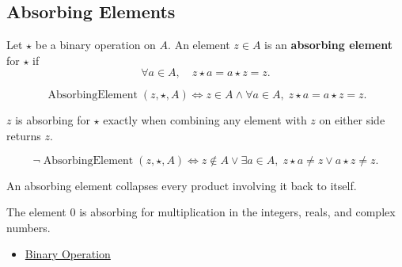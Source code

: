 \subsection*{Absorbing Elements}
\label{subsec:absorbing-elements}

\begin{definition}
\label{def:algebraic-absorbing-element}
Let $\star$ be a binary operation on $A$.
An element $z\in A$ is an \textbf{absorbing element} for $\star$ if
\[
\forall a\in A,\quad z\star a=a\star z=z.
\]
\end{definition}

\begin{remark*}
\[
\operatorname{AbsorbingElement}(z,\star,A)
\Longleftrightarrow
z\in A
\land
\forall a\in A,\; z\star a=a\star z=z.
\]
\end{remark*}

\begin{remark*}
$z$ is absorbing for $\star$ exactly when combining any element with $z$ on
either side returns $z$.
\end{remark*}

\begin{remark*}
\[
\neg\operatorname{AbsorbingElement}(z,\star,A)
\Longleftrightarrow
z\notin A
\lor
\exists a\in A,\; z\star a\neq z \lor a\star z\neq z.
\]
\end{remark*}

\begin{remark*}[Interpretation]
An absorbing element collapses every product involving it back to itself.
\end{remark*}

\begin{remark*}[Examples]
The element $0$ is absorbing for multiplication in the integers, reals, and
complex numbers.
\end{remark*}

\begin{dependencies}
\begin{itemize}
  \item \hyperref[def:binary-operation]{Binary Operation}
\end{itemize}
\end{dependencies}

